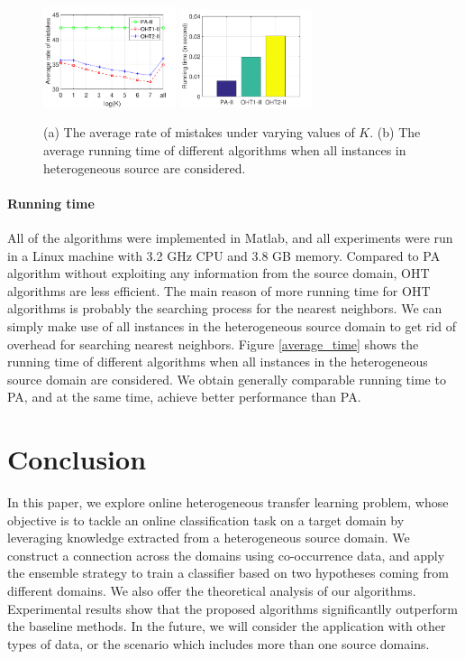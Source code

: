 \documentclass[letterpaper]{article}
\theoremstyle{remark}
\theoremstyle{definition}
\begin{document}
\begin{figure}[!htb]
\centering
  \subfigure
  {
    \label{average_error}
    \includegraphics[width=3.9cm]{average_error.pdf}
  }
  \subfigure
  {
    \label{average_time}
    \includegraphics[width=3.9cm]{average_time.pdf}
  }
  \caption{(a) The average rate of mistakes under varying values of $K$. (b) The average running time of different algorithms when all instances in heterogeneous source are considered.}
  \label{average eok}
\end{figure}

\paragraph{Running time}
All of the algorithms were implemented in Matlab, and all experiments were run in a Linux machine with 3.2 GHz CPU and 3.8 GB memory.
Compared to PA algorithm without exploiting any information from the source domain, OHT algorithms are less efficient.
The main reason of more running time for OHT algorithms is probably the searching process for the nearest neighbors.
We can simply make use of all instances in the heterogeneous source domain to get rid of overhead for searching nearest neighbors.
Figure \ref{average_time} shows the running time of different algorithms when all instances in the heterogeneous source domain are considered.
We obtain generally comparable running time to PA, and at the same time, achieve better performance than PA.

\section{Conclusion}

In this paper, we explore online heterogeneous transfer learning problem, whose objective is to tackle an online classification task on a target domain by leveraging knowledge extracted from a heterogeneous source domain.
We construct a connection across the domains using co-occurrence data, and apply the ensemble strategy to train a classifier based on two hypotheses coming from different domains.
We also offer the theoretical analysis of our algorithms.
Experimental results show that the proposed algorithms significantlly outperform the baseline methods.
In the future, we will consider the application with other types of data, or the scenario which includes more than one source domains.



\end{document}
